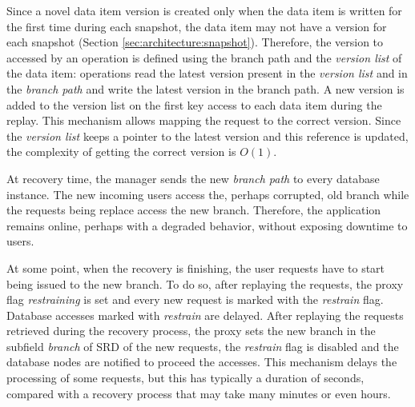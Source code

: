Since a novel data item version is created only when the data item is written for the first time during each snapshot, the data item may not have a version for each snapshot (Section \ref{sec:architecture:snapshot}). Therefore, the version to accessed by an operation is defined using the branch path and the \emph{version list} of the data item: operations read the latest version present in the \emph{version list} and in the \emph{branch path} and write the latest version in the branch path. A new version is added to the version list on the first key access to each data item during the replay. This mechanism allows mapping the request to the correct version. Since the \emph{version list} keeps a pointer to the latest version and this reference is updated, the complexity of getting the correct version is $O(1)$. 

At recovery time, the manager sends the new \emph{branch path} to every database instance. The new incoming users access the, perhaps corrupted, old branch while the requests being replace access the new branch. Therefore, the application remains online, perhaps with a degraded behavior, without exposing downtime to users.

At some point, when the recovery is finishing, the user requests have to start being issued to the new branch. To do so, after replaying the requests, the proxy flag \emph{restraining} is set and every new request is marked with the \emph{restrain} flag. Database accesses marked with \emph{restrain} are delayed. After replaying the requests retrieved during the recovery process, the proxy sets the new branch in the subfield \emph{branch} of \ac{SRD} of the new requests, the \emph{restrain} flag is disabled and the database nodes are notified to proceed the accesses. This mechanism delays the processing of some requests, but this has typically a duration of seconds, compared with a recovery process that may take many minutes or even hours.